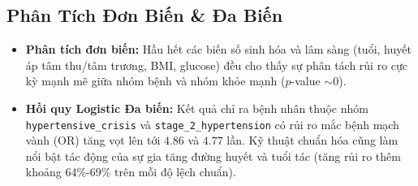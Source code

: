 \documentclass[11pt, a4paper]{article}
\begin{document}
\subsection{Phân Tích Đơn Biến \& Đa Biến}
\begin{itemize}
    \item \textbf{Phân tích đơn biến:} Hầu hết các biến số sinh hóa và lâm sàng (tuổi, huyết áp tâm thu/tâm trương, BMI, glucose) đều cho thấy sự phân tách rủi ro cực kỳ mạnh mẽ giữa nhóm bệnh và nhóm khỏe mạnh ($p$-value $\sim 0$).
    \item \textbf{Hồi quy Logistic Đa biến:} Kết quả chỉ ra bệnh nhân thuộc nhóm \texttt{hypertensive\_crisis} và \texttt{stage\_2\_hypertension} có rủi ro mắc bệnh mạch vành (OR) tăng vọt lên tới $\mathbf{4.86}$ và $\mathbf{4.77}$ lần. Kỹ thuật chuẩn hóa cũng làm nổi bật tác động của sự gia tăng đường huyết và tuổi tác (tăng rủi ro thêm khoảng 64\%-69\% trên mỗi độ lệch chuẩn).
\end{itemize}
\end{document}
